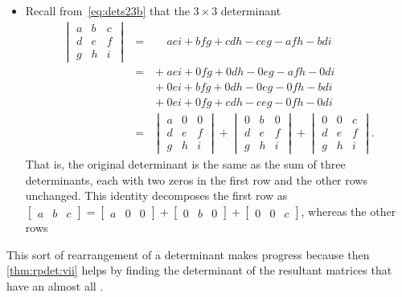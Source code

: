 \begin{example}
\begin{itemize}
\item Recall from~\eqref{eq:dets23b} that the \(3\times3\) determinant
\begin{eqnarray*}
\begin{vmatrix} a&b&c\\d&e&f\\g&h&i \end{vmatrix}
&=&\phantom{{}+}aei+bfg+cdh-ceg-afh-bdi
\\&=&{}+aei+0fg+0dh-0eg-afh-0di
\\&&{}+0ei+bfg+0dh-0eg-0fh-bdi
\\&&{}+0ei+0fg+cdh-ceg-0fh-0di
\\&=&\begin{vmatrix} a&0&0\\d&e&f\\g&h&i \end{vmatrix}
+\begin{vmatrix} 0&b&0\\d&e&f\\g&h&i \end{vmatrix}
+\begin{vmatrix} 0&0&c\\d&e&f\\g&h&i \end{vmatrix}.
\end{eqnarray*}
That is, the original determinant is the same as the sum of three determinants, each with two zeros in the first row and the other rows unchanged.
This identity decomposes the first row as \(\begin{bmatrix} a&b&c \end{bmatrix}=\begin{bmatrix} a&0&0 \end{bmatrix}+\begin{bmatrix} 0&b&0 \end{bmatrix}+\begin{bmatrix} 0&0&c \end{bmatrix}\), whereas the other rows 
\end{itemize}
This sort of rearrangement of a determinant makes progress because then \cref{thm:rpdet:vii} helps by finding the determinant of the resultant matrices that have an almost all .
\end{example}

